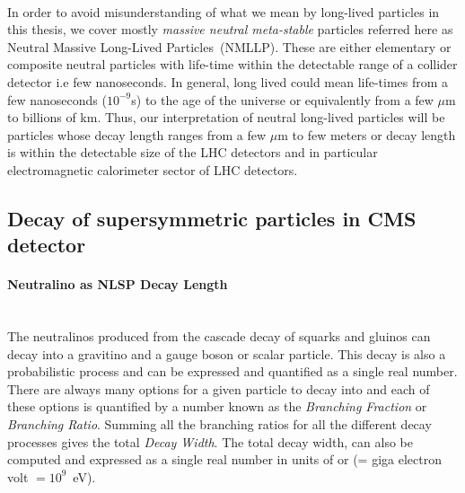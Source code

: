 {\paragraph*{}
In order to avoid misunderstanding of what we mean by long-lived particles in this thesis, we cover mostly \textit{massive neutral meta-stable} particles  referred here as \textsf{Neutral Massive Long-Lived Particles}~(NMLLP). These are either elementary or composite neutral particles with life-time within the detectable range of a collider detector i.e few nanoseconds. In general, 
long lived could mean life-times from a few nanoseconds ($10^{-9}$s) to the age of the universe or equivalently from a few  $\mu$m to billions of km.
Thus, our interpretation of neutral long-lived particles will be particles whose decay length ranges from a few $\mu$m to few meters or decay length is within the detectable size of the LHC detectors and in particular electromagnetic calorimeter sector of LHC detectors.


\subsection{Decay of supersymmetric particles in CMS detector}
\paragraph{Neutralino as NLSP Decay Length}\mbox{}\\
The neutralinos produced from the cascade decay of squarks and gluinos can decay into a gravitino and a gauge boson or scalar particle. This decay is also a probabilistic process and can be expressed and quantified as a single real number. 
 There are always many options for a given particle to decay into and each of these options is quantified by a number known as the \textit{Branching  Fraction} or \textit{Branching Ratio}. Summing all the branching ratios for all the different decay processes gives the total \textit{Decay Width}. The total decay width, can also be computed and expressed as a single real number in units of \GeV or \MeV (\GeV = giga electron volt $=10^{9}$~eV). 
}
